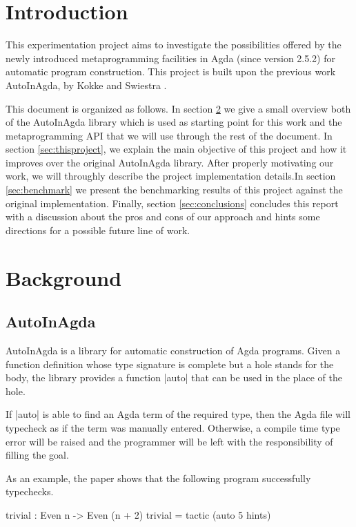 \documentclass[12pt]{article}
\begin{document}
\section{Introduction}

This experimentation project aims to investigate the possibilities offered by the
newly introduced metaprogramming facilities in Agda (since version 2.5.2) for
automatic program construction. This project is built upon the previous work
AutoInAgda, by Kokke and Swiestra \cite{Kokke2015}.

This document is organized as follows. In section \ref{sec:background} we give a
small overview both of the AutoInAgda library which is used as starting point for
this work and the metaprogramming API that we will use through the rest of the
document. In section \ref{sec:thisproject}, we explain the main objective of this project
and how it improves over the original AutoInAgda library. After properly
motivating our work, we will throughly describe the project implementation
details.In section \ref{sec:benchmark} we present the benchmarking results of this
project against the original implementation. Finally, section
\ref{sec:conclusions} concludes this report with a discussion about the pros and
cons of our approach and hints some directions  for a possible future line of
work.

\section{Background}
\label{sec:background}

\subsection{AutoInAgda}
\label{subsec:AutoInAgda}

AutoInAgda is a library for automatic construction of Agda programs. Given a
function definition whose type signature is complete but a hole stands for
the body, the library provides a function |auto| that can be used in the place
of the hole.

If |auto| is able to find an Agda term of the required type, then the Agda file
will typecheck as if the term was manually entered. Otherwise, a compile time
type error will be raised and the programmer will be left with the
responsibility of filling the goal.

As an example, the paper shows that the following program successfully
typechecks.

\begin{code}
  trivial : Even n -> Even (n + 2)
  trivial = tactic (auto 5 hints)
\end{code}
\end{document}
